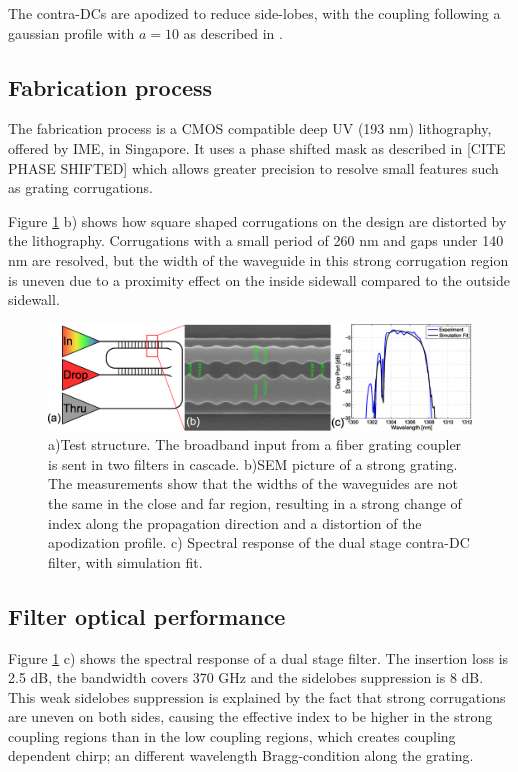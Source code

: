 \documentclass[letterpaper,10pt]{article}
\begin{document}
The contra-DCs are apodized to reduce side-lobes, with the coupling following a gaussian profile with $a=10$ as described in \cite{shi2013siliconContraDC}.


\subsection{Fabrication process}
The fabrication process is a CMOS compatible deep UV (193 nm) lithography, offered by IME, in Singapore. It uses a phase shifted mask as described in [CITE PHASE SHIFTED] which allows greater precision to resolve small features such as grating corrugations. 

Figure \ref{fig:litho} b) shows how square shaped corrugations on the design are distorted by the lithography. Corrugations with a small period of 260 nm and gaps under 140 nm are resolved, but the width of the waveguide in this strong corrugation region is uneven due to a proximity effect on the inside sidewall compared to the outside sidewall.

\begin{figure}[htbp]
	\centering
	\includegraphics[width=.99\columnwidth]{SingleFilterFig}
	\caption{ a)Test structure. The broadband input from a fiber grating coupler is sent in two filters in cascade. b)SEM picture of a strong grating. The measurements show that the widths of the waveguides are not the same in the close and far region, resulting in a strong change of index along the propagation direction and a distortion of the apodization profile. c) Spectral response of the dual stage contra-DC filter, with simulation fit. }
	\label{fig:litho}
\end{figure}

\subsection{Filter optical performance}
Figure \ref{fig:litho} c) shows the spectral response of a dual stage filter. The insertion loss is 2.5 dB, the bandwidth covers 370 GHz and the sidelobes suppression is 8 dB. This weak sidelobes suppression is explained by the fact that strong corrugations are uneven on both sides, causing the effective index to be higher in the strong coupling regions than in the low coupling regions, which creates coupling dependent chirp; an different wavelength Bragg-condition along the grating. 
\end{document}
